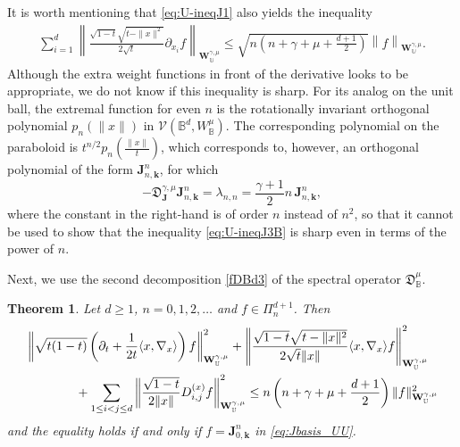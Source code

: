 \documentclass{amsart}
\newtheorem{thm}{Theorem}[section]
\theoremstyle{remark}
\def\la{{\langle}}
\def\ra{{\rangle}}
\def\fD{{\mathfrak D}}
\def\g{{\gamma}}
\def\l{{\lambda}}
\def\la{{\langle}}
\def\ra{{\rangle}}
\def\kb{{\mathbf k}}
\def\Jb{{\mathbf J}}
\def\Wb{{\mathbf W}}
\def\CV{{\mathcal V}}
\def\BB{{\mathbb B}}
\def\UU{{\mathbb U}}
\begin{document}
It is worth mentioning that \eqref{eq:U-ineqJ1} also yields the inequality 
\begin{align}\label{eq:U-ineqJ3B}
 \sum_{i=1}^d \left \| \frac{\sqrt{1-t} \sqrt{t-\|x\|^2}}{2 \sqrt{t}} \partial_{x_i} f \right \|_{\Wb_{\UU}^{\g,\mu}}
 \le \sqrt{n\left(n+\g+\mu+\tfrac{d+1}{2}\right)} \left \|f \right \|_{\Wb_{\UU}^{\g,\mu}}.   
\end{align}
Although the extra weight functions in front of the derivative looks to be appropriate, we do not know if this inequality is sharp. 
For its analog on the unit ball, the extremal function for even $n$ is the rotationally invariant orthogonal polynomial 
$p_n(\|x\|)$ in $\CV(\BB^d, W_\BB^\mu)$. The corresponding polynomial on the paraboloid is 
$ t^{n/2} p_n\left(\frac{\|x\|}{t}\right)$, which corresponds to, however, an orthogonal polynomial of the form $\Jb_{n, \kb}^n$, for which 
$$
 - \fD_{\Jb}^{\g,\mu} \Jb_{n, \kb}^n = \l_{n,n} = \frac{\g+1}{2} n \, \Jb_{n, \kb}^n,
$$ 
where the constant in the right-hand is of order $n$ instead of $n^2$, so that it cannot be used to show that 
the inequality \eqref{eq:U-ineqJ3B} is sharp even in terms of the power of $n$.  \medskip

Next, we use the second decomposition \eqref{fDBd3} of the spectral operator $\fD_\BB^\mu$. 

\begin{thm} \label{thm:B-ineqUJ2}
Let $d \ge 1$, $n = 0,1,2,\ldots$ and $f \in \Pi_n^{d+1}$. Then
\begin{align} \label{eq:U-ineqB}
& \left\| \sqrt{ t(1-t)}  \left( \partial_t + \frac{1}{2t} \la x ,\nabla_x\ra \right) f\right \|_{\Wb_{\UU}^{\g,\mu}}^2 +
  \left\| \frac{\sqrt{1-t} \sqrt{t-\|x\|^2} }{2 \sqrt{t} \|x\|} \la x ,\nabla_x\ra f \right \|_{\Wb_{\UU}^{\g,\mu}}^2  \\
 & \qquad\qquad  
  +  \sum_{1\le i<j\le d} \left \| \frac{\sqrt{1-t}}{2 \|x\|}  D_{i, j}^{(x)} f \right \|_{\Wb_{\UU}^{\g,\mu}}^2
       \le n\left(n+\g+\mu+\frac{d+1}{2}\right) \|f \|_{\Wb_{\UU}^{\g,\mu}}^2 \notag
\end{align} 
and the equality holds if and only if $f= \Jb_{0,\kb}^n$ in \eqref{eq:Jbasis_UU}. 
\end{thm}
\end{document}
